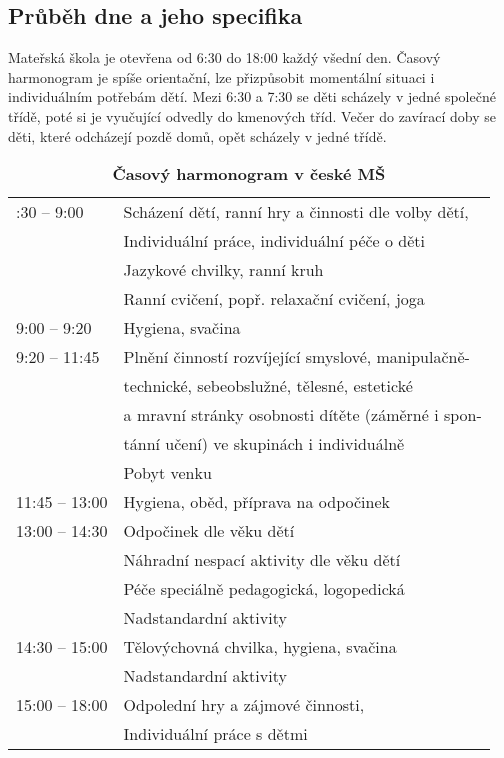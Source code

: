 	\subsection{Průběh dne a jeho specifika}

			Mateřská škola je otevřena od 6:30 do 18:00 každý všední den. Časový harmonogram je spíše orientační, lze přizpůsobit momentální situaci i individuálním potřebám dětí. Mezi 6:30 a 7:30 se děti scházely v jedné společné třídě, poté si je vyučující odvedly do kmenových tříd. Večer do zavírací doby se děti, které odcházejí pozdě domů, opět scházely v jedné třídě.

		\begin{spacing}{1.0}
		\begin{table}[h!]
			\center
			\begin{tabular}{|l l|}
				\rowcolor{white}
				\hline
			6:30 – 9:00				& Scházení dětí, ranní hry a činnosti dle volby dětí, 	\\ 
									& Individuální práce, individuální péče o děti\\
									& Jazykové chvilky, ranní kruh 	\\
									& Ranní cvičení, popř. relaxační cvičení, joga \\
			9:00 – 9:20				& Hygiena, svačina	\\
			9:20 – 11:45			& Plnění činností rozvíjející smyslové, manipulačně-	\\
									& technické, sebeobslužné, tělesné, estetické \\
									& a mravní stránky osobnosti dítěte (záměrné i spon- \\
									& tánní učení) ve skupinách i individuálně \\
									& Pobyt venku					\\
			11:45 – 13:00			& Hygiena, oběd, příprava na odpočinek					\\
			13:00 – 14:30			& Odpočinek dle věku dětí						\\
									& Náhradní nespací aktivity dle věku dětí 				\\
									& Péče speciálně pedagogická, logopedická				\\ 
									& Nadstandardní aktivity 							 \\
			14:30 – 15:00			& Tělovýchovná chvilka, hygiena, svačina 			\\
									& Nadstandardní aktivity 		\\
			15:00 – 18:00			& Odpolední hry a zájmové činnosti, \\
									& Individuální práce s dětmi\\
			\hline
			\end{tabular}
			\caption{ \textbf{Časový harmonogram v české MŠ}
			}
			\label{tab:rezimDneCR}
		\end{table}
		\end{spacing}

